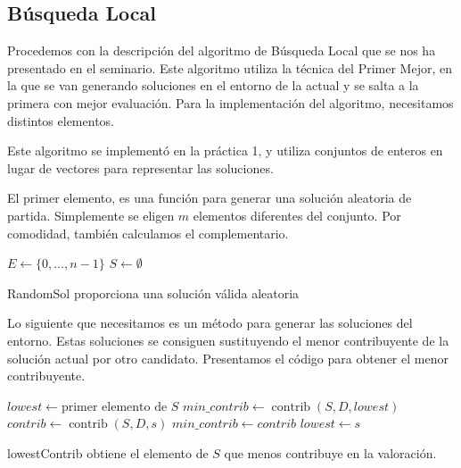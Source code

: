 \documentclass{article}
\begin{document}
\subsection{Búsqueda Local}

Procedemos con la descripción del algoritmo de Búsqueda Local que se nos ha presentado en el seminario. 
Este algoritmo utiliza la técnica del Primer Mejor, en la que se van generando soluciones en el entorno de la actual y se
salta a la primera con mejor evaluación. Para la implementación del algoritmo, necesitamos distintos elementos.

Este algoritmo se implementó en la práctica 1, y utiliza conjuntos de enteros en lugar de vectores para representar
las soluciones.

El primer elemento, es una función para generar una solución aleatoria de partida. Simplemente se eligen $m$ elementos 
diferentes del conjunto. Por comodidad, también calculamos el complementario.

\begin{algorithm}[H]
	\DontPrintSemicolon %
	$E \gets \{0,\ldots, n-1\}$ 
	$S \gets \emptyset$ 
	\;
	 
	\caption{{\sc RandomSol} proporciona una solución válida aleatoria}
	\label{alg:randomsol-ls}
\end{algorithm}

Lo siguiente que necesitamos es un método para generar las soluciones del entorno. Estas soluciones se consiguen sustituyendo
el menor contribuyente de la solución actual por otro candidato. Presentamos el código para obtener el menor contribuyente.

\begin{algorithm}[H]
	\DontPrintSemicolon %
	$lowest \gets \text{primer elemento de } S$\;
	$min\_contrib \gets \operatorname{contrib}(S,D,lowest)$\;
	 {
		$contrib \gets \operatorname{contrib}(S,D,s)$\;
		 { 
			$min\_contrib \gets contrib$\;
			$lowest \gets s$ 
		}
	}
	\;
	\;
	\caption{{\sc lowestContrib} obtiene el elemento de $S$ que menos contribuye en la valoración.}
	\label{alg:lowest-contributor-ls}
\end{algorithm}
\end{document}
